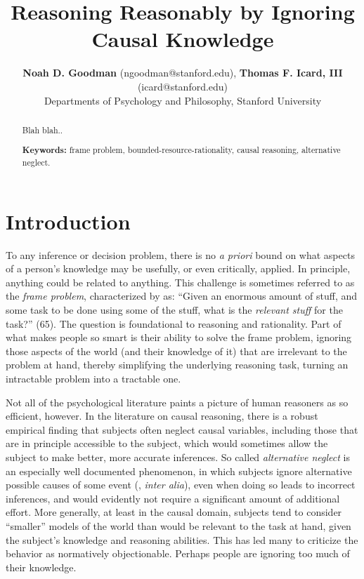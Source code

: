 \documentclass[10pt,letterpaper]{article}
\title{Reasoning Reasonably by Ignoring Causal Knowledge}
\author{{\large \bf Noah D. Goodman} (ngoodman@stanford.edu), {\large \bf Thomas F. Icard, III} (icard@stanford.edu) \\
  Departments of Psychology and Philosophy, Stanford University}
\begin{document}
\maketitle


\begin{abstract}
Blah blah.. \vspace{2.2in}

\textbf{Keywords:} 
frame problem, bounded-resource-rationality, causal reasoning, alternative neglect.
\end{abstract}

\section{Introduction}

To any inference or decision problem, there is no \emph{a priori} bound on what aspects of a person's knowledge may be usefully, or even critically, applied. In principle, anything could be related to anything. 
This challenge is sometimes referred to as the \emph{frame problem}, characterized by \cite{Glymour1987} as: ``Given an enormous amount of stuff, and some task to be done using some of the stuff, what is the \emph{relevant stuff} for the task?'' (65). The question is foundational to reasoning and rationality. 
Part of what makes people so smart is their ability to solve the frame problem, ignoring those aspects of the world (and their knowledge of it) that are irrelevant to the problem at hand, thereby simplifying the underlying reasoning task, turning an intractable problem into a tractable one.

Not all of the psychological literature paints a picture of human reasoners as so efficient, however. In the literature on causal reasoning, there is a robust empirical finding that subjects often neglect causal variables, including those that are in principle accessible to the subject, which would sometimes allow the subject to make better, more accurate inferences. So called \emph{alternative neglect} is an especially well documented phenomenon, in which subjects ignore alternative possible causes of some event (\citealt{Fischhoff1978,KlaymanHa,Fernbach2011}, \emph{inter alia}), even when doing so leads to incorrect inferences, and would evidently not require a significant  amount of additional effort. More generally, at least in the causal domain, subjects tend to consider ``smaller'' models of the world than would be relevant to the task at hand, given the subject's knowledge and reasoning abilities. This has led many to criticize the behavior as normatively objectionable. Perhaps people are ignoring too much of their knowledge.
\end{document}
